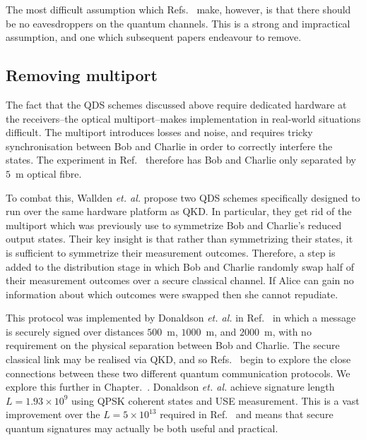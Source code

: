 The most difficult assumption which Refs.~\cite{Clarke2012, Dunjko2014, Collins2014} make, however, is that there should be no eavesdroppers on the quantum channels. This is a strong and impractical assumption, and one which subsequent papers endeavour to remove.


\subsection*{Removing multiport}

The fact that the QDS schemes discussed above require dedicated hardware at the receivers--the optical multiport--makes implementation in real-world situations difficult. The multiport introduces losses and noise, and requires tricky synchronisation between Bob and Charlie in order to correctly interfere the states. The experiment in Ref.~\cite{Collins2014} therefore has Bob and Charlie only separated by $5$~m optical fibre. 

To combat this, Wallden \emph{et. al.} \cite{Wallden2015} propose two QDS schemes specifically designed to run over the same hardware platform as QKD. In particular, they get rid of the multiport which was previously use to symmetrize Bob and Charlie's reduced output states. Their key insight is that rather than symmetrizing their states, it is sufficient to symmetrize their measurement outcomes. Therefore, a step is added to the distribution stage in which Bob and Charlie randomly swap half of their measurement outcomes over a secure classical channel. If Alice can gain no information about which outcomes were swapped then she cannot repudiate. 

This protocol was implemented by Donaldson \emph{et. al.} in Ref.~\cite{Donaldson2016} in which a message is securely signed over distances $500$~m, $1000$~m, and $2000$~m, with no requirement on the physical separation between Bob and Charlie. The secure classical link may be realised via QKD, and so Refs.~\cite{Wallden2015, Donaldson2016} begin to explore the close connections between these two different quantum communication protocols. We explore this further in Chapter.~. Donaldson \emph{et. al.} achieve signature length $L = 1.93 \times 10^9$ using QPSK coherent states and USE measurement. This is a vast improvement over the $L = 5 \times 10^{13}$ required in Ref.~\cite{Collins2014} and means that secure quantum signatures may actually be both useful and practical. 

